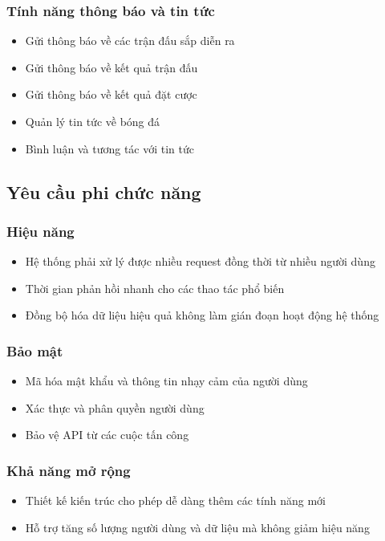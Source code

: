 \documentclass[a4paper,12pt]{report}
\begin{document}
\subsubsection{Tính năng thông báo và tin tức}
\begin{itemize}
    \item Gửi thông báo về các trận đấu sắp diễn ra
    \item Gửi thông báo về kết quả trận đấu
    \item Gửi thông báo về kết quả đặt cược
    \item Quản lý tin tức về bóng đá
    \item Bình luận và tương tác với tin tức
\end{itemize}

\subsection{Yêu cầu phi chức năng}

\subsubsection{Hiệu năng}
\begin{itemize}
    \item Hệ thống phải xử lý được nhiều request đồng thời từ nhiều người dùng
    \item Thời gian phản hồi nhanh cho các thao tác phổ biến
    \item Đồng bộ hóa dữ liệu hiệu quả không làm gián đoạn hoạt động hệ thống
\end{itemize}

\subsubsection{Bảo mật}
\begin{itemize}
    \item Mã hóa mật khẩu và thông tin nhạy cảm của người dùng
    \item Xác thực và phân quyền người dùng
    \item Bảo vệ API từ các cuộc tấn công
\end{itemize}

\subsubsection{Khả năng mở rộng}
\begin{itemize}
    \item Thiết kế kiến trúc cho phép dễ dàng thêm các tính năng mới
    \item Hỗ trợ tăng số lượng người dùng và dữ liệu mà không giảm hiệu năng
\end{itemize}
\end{document}
